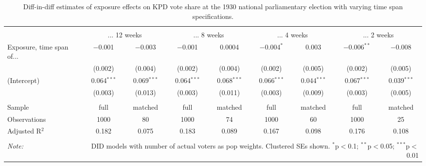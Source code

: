 
\begin{table}[!htbp] \centering 
  \caption{Diff-in-diff estimates of exposure effects on KPD vote share at the 1930 national parliamentary election with varying time span specifications.\vspace{-.25cm}} 
  \label{tab:nsdap-voteshare-kpd-timespan-dd-1930} 
\scriptsize 
\begin{tabular}{@{\extracolsep{5pt}}lcccccccc} 
\\[-1.8ex]\hline 
\hline \\[-1.8ex] 
 & \multicolumn{2}{c}{... 12 weeks} & \multicolumn{2}{c}{... 8 weeks} & \multicolumn{2}{c}{... 4 weeks} & \multicolumn{2}{c}{... 2 weeks} \\ 
 \cmidrule(r){2-3}\cmidrule(r){4-5}\cmidrule(r){6-7}\cmidrule(r){8-9}Exposure, time span of... & $-$0.001 & $-$0.003 & $-$0.001 & 0.0004 & $-$0.004$^{*}$ & 0.003 & $-$0.006$^{**}$ & $-$0.008 \\ 
  & (0.002) & (0.004) & (0.002) & (0.004) & (0.002) & (0.005) & (0.002) & (0.005) \\ 
  (Intercept) & 0.064$^{***}$ & 0.069$^{***}$ & 0.064$^{***}$ & 0.068$^{***}$ & 0.066$^{***}$ & 0.044$^{***}$ & 0.067$^{***}$ & 0.039$^{***}$ \\ 
  & (0.003) & (0.013) & (0.003) & (0.011) & (0.003) & (0.009) & (0.003) & (0.005) \\ 
 \hline \\[-1.8ex] 
Sample & full & matched & full & matched & full & matched & full & matched \\ 
Observations & 1000 & 80 & 1000 & 74 & 1000 & 60 & 1000 & 25 \\ 
Adjusted R$^{2}$ & 0.182 & 0.075 & 0.183 & 0.089 & 0.167 & 0.098 & 0.176 & 0.108 \\ 
\hline 
\hline \\[-1.8ex] 
\textit{Note:}  & \multicolumn{8}{r}{DID models with number of actual voters as pop weights. Clustered SEs shown. $^{*}$p$<$0.1; $^{**}$p$<$0.05; $^{***}$p$<$0.01} \\ 
\end{tabular} 
\end{table} 

